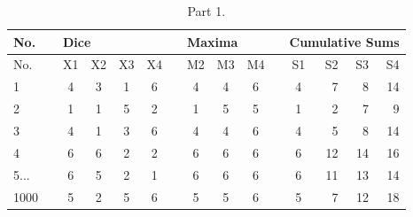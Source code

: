 \documentclass[12pt]{article}
\begin{document}
\begin{table}[h]
\centering
\label{my-label}
\begin{tabular}{|l|c|c|c|c|c|c|c|c|c|c|c|r|r|r|}
\hline
No.	&	&	\multicolumn{4}{l|}{Dice} &  & \multicolumn{3}{l|}{Maxima} &  & \multicolumn{4}{l|}{Cumulative Sums} \\ \hline
No.	&	& X1   & X2 & X3 & X4 &  & M2     & M3 & M4 &  & S1              & S2 & S3 & S4 \\ \hline
1 &	& 4    & 3  & 1  & 6  &  & 4      & 4  & 6  &  & 4               & 7  & 8  & 14 \\ \hline
2 &	& 1    & 1  & 5  & 2  &  & 1      & 5  & 5  &  & 1               & 2  & 7  & 9  \\ \hline
3 & & 4    & 1  & 3  & 6  &  & 4      & 4  & 6  &  & 4               & 5  & 8  & 14 \\ \hline
4 & & 6    & 6  & 2  & 2  &  & 6      & 6  & 6  &  & 6               & 12 & 14 & 16 \\ \hline
5...&  & 6    & 5  & 2  & 1  &  & 6      & 6  & 6  &  & 6               & 11 & 13 & 14 \\ \hline
1000& &5		& 2	& 5	& 6	& 	&5		&5	&6	&	&5					&7	&12	&18\\ \hline
\end{tabular}
\caption{Part 1.}
\end{table}
\end{document}
